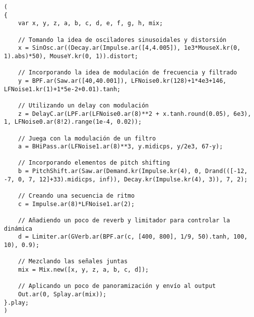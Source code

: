 \begin{minipage}[t]{1\textwidth}
    \centering
    \begin{lstlisting}[style=SuperCollider-IDE, basicstyle=\footnotesize\ttfamily, numbers=none]
(
{
    var x, y, z, a, b, c, d, e, f, g, h, mix;

    // Tomando la idea de osciladores sinusoidales y distorsión
    x = SinOsc.ar((Decay.ar(Impulse.ar([4,4.005]), 1e3*MouseX.kr(0, 1).abs)*50), MouseY.kr(0, 1)).distort;

    // Incorporando la idea de modulación de frecuencia y filtrado
    y = BPF.ar(Saw.ar([40,40.001]), LFNoise0.kr(128)+1*4e3+146, LFNoise1.kr(1)+1*5e-2+0.01).tanh;

    // Utilizando un delay con modulación
    z = DelayC.ar(LPF.ar(LFNoise0.ar(8)**2 + x.tanh.round(0.05), 6e3), 1, LFNoise0.ar(8!2).range(1e-4, 0.02));

    // Juega con la modulación de un filtro
    a = BHiPass.ar(LFNoise1.ar(8)**3, y.midicps, y/2e3, 67-y);

    // Incorporando elementos de pitch shifting
    b = PitchShift.ar(Saw.ar(Demand.kr(Impulse.kr(4), 0, Drand(([-12, -7, 0, 7, 12]+33).midicps, inf)), Decay.kr(Impulse.kr(4), 3)), 7, 2);

    // Creando una secuencia de ritmo
    c = Impulse.ar(8)*LFNoise1.ar(2);

    // Añadiendo un poco de reverb y limitador para controlar la dinámica
    d = Limiter.ar(GVerb.ar(BPF.ar(c, [400, 800], 1/9, 50).tanh, 100, 10), 0.9);

    // Mezclando las señales juntas
    mix = Mix.new([x, y, z, a, b, c, d]);

    // Aplicando un poco de panoramización y envío al output
    Out.ar(0, Splay.ar(mix));
}.play;
)        
    \end{lstlisting}
    \vspace{1cm}
\end{minipage}
























